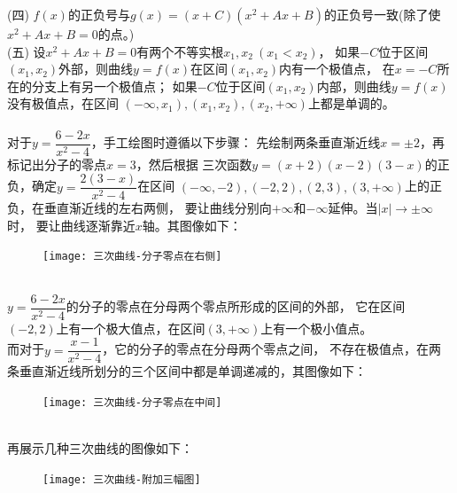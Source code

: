 \begin{enumerate}[label={【\textbf{例\thechapter.\arabic*}】},
 leftmargin=\inteval{\myenumleftmargin}pt,
 itemsep=\inteval{\myenumitempsep}pt,
 itemindent=\inteval{\myenumitemindent}pt]
(四) $f(x)$的正负号与$g(x)=(x+C)(x^2+Ax+B)$的正负号一致(除了使$x^2+Ax+B=0$的点。)\\
(五) 设$x^2+Ax+B=0$有两个不等实根$x_1,x_2\ (x_1<x_2)$，
如果$-C$位于区间$(x_1,x_2)$外部，则曲线$y=f(x)$在区间$(x_1,x_2)$内有一个极值点，
在$x=-C$所在的分支上有另一个极值点；
如果$-C$位于区间$(x_1,x_2)$内部，则曲线$y=f(x)$没有极值点，在区间
$(-\infty,x_1),(x_1,x_2),(x_2,+\infty)$上都是单调的。\\
\\
对于$ y=\dfrac{6-2x}{x^2-4} $，手工绘图时遵循以下步骤：
先绘制两条垂直渐近线$ x=\pm 2 $，再标记出分子的零点$x=3$，然后根据
三次函数$y=(x+2)(x-2)(3-x) $的正负，确定$ y=\dfrac{2(3-x)}{x^2-4} $在区间
$ (-\infty,-2),(-2,2),(2,3),(3,+\infty) $上的正负，在垂直渐近线的左右两侧，
要让曲线分别向$+\infty$和$-\infty$延伸。当$ |x|\to \pm\infty $时，
要让曲线逐渐靠近$ x $轴。其图像如下：
\begin{figure}[h] %
    \centering
    \texttt{[image: 三次曲线-分子零点在右侧]}
\end{figure} \\
$ y=\dfrac{6-2x}{x^2-4} $的分子的零点在分母两个零点所形成的区间的外部，
它在区间$(-2,2)$上有一个极大值点，在区间$(3,+\infty)$上有一个极小值点。\\
而对于$ y=\dfrac{x-1}{x^2-4} $，它的分子的零点在分母两个零点之间，
不存在极值点，在两条垂直渐近线所划分的三个区间中都是单调递减的，其图像如下：
\begin{figure}[h] %
    \centering
    \texttt{[image: 三次曲线-分子零点在中间]}
\end{figure} \\
再展示几种三次曲线的图像如下：
\begin{figure}[h] %
    \centering
    \texttt{[image: 三次曲线-附加三幅图]}
\end{figure} 


\end{enumerate}
